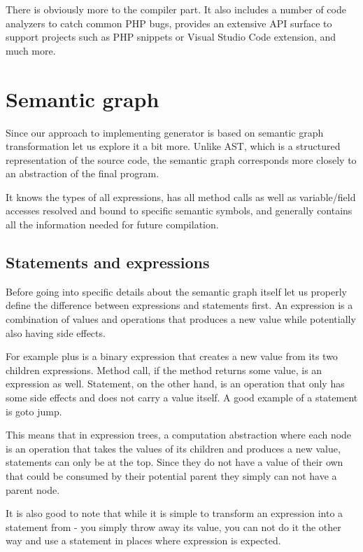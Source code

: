 There is obviously more to the compiler part. It also includes a number of code analyzers to catch common PHP bugs, provides an extensive API surface to support projects such as PHP snippets or Visual Studio Code extension, and much more.

\section{Semantic graph}

Since our approach to implementing generator is based on semantic graph transformation let us explore it a bit more. Unlike AST, which is a structured representation of the source code, the semantic graph corresponds more closely to an abstraction of the final program.

It knows the types of all expressions, has all method calls as well as variable/field accesses resolved and bound to specific semantic symbols, and generally contains all the information needed for future compilation.

\subsection{Statements and expressions}

Before going into specific details about the semantic graph itself let us properly define the difference between expressions and statements first. An expression is a combination of values and operations that produces a new value while potentially also having side effects. 

For example plus is a binary expression that creates a new value from its two children expressions. Method call, if the method returns some value, is an expression as well. Statement, on the other hand, is an operation that only has some side effects and does not carry a value itself. A good example of a statement is goto jump.

This means that in expression trees, a computation abstraction where each node is an operation that takes the values of its children and produces a new value, statements can only be at the top. Since they do not have a value of their own that could be consumed by their potential parent they simply can not have a parent node. 

It is also good to note that while it is simple to transform an expression into a statement from - you simply throw away its value, you can not do it the other way and use a statement in places where expression is expected. 

